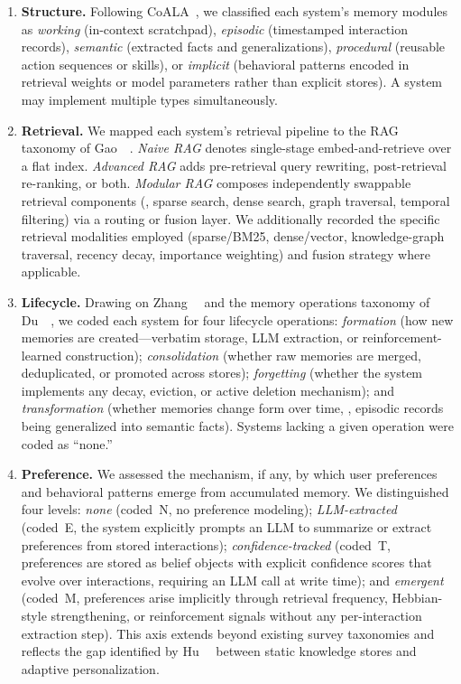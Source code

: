 \begin{enumerate}[leftmargin=*, nosep]
    \item \textbf{Structure.} Following CoALA~\cite{sumers2024coala}, we
    classified each system's memory modules as \emph{working} (in-context
    scratchpad), \emph{episodic} (timestamped interaction records),
    \emph{semantic} (extracted facts and generalizations),
    \emph{procedural} (reusable action sequences or skills), or
    \emph{implicit} (behavioral patterns encoded in retrieval weights or
    model parameters rather than explicit stores). A system may implement
    multiple types simultaneously.

    \item \textbf{Retrieval.} We mapped each system's retrieval pipeline
    to the RAG taxonomy of Gao~\etal~\cite{gao2023rag}. \emph{Naive RAG}
    denotes single-stage embed-and-retrieve over a flat index.
    \emph{Advanced RAG} adds pre-retrieval query rewriting, post-retrieval
    re-ranking, or both. \emph{Modular RAG} composes independently
    swappable retrieval components (\eg, sparse search, dense search,
    graph traversal, temporal filtering) via a routing or fusion layer.
    We additionally recorded the specific retrieval modalities employed
    (sparse/BM25, dense/vector, knowledge-graph traversal, recency decay,
    importance weighting) and fusion strategy where applicable.

    \item \textbf{Lifecycle.} Drawing on Zhang~\etal~\cite{zhang2024survey}
    and the memory operations taxonomy of Du~\etal~\cite{du2025memory}, we
    coded each system for four lifecycle operations: \emph{formation} (how
    new memories are created---verbatim storage, LLM extraction, or
    reinforcement-learned construction); \emph{consolidation} (whether raw
    memories are merged, deduplicated, or promoted across stores);
    \emph{forgetting} (whether the system implements any decay, eviction,
    or active deletion mechanism); and \emph{transformation} (whether
    memories change form over time, \eg, episodic records being
    generalized into semantic facts). Systems lacking a given operation
    were coded as ``none.''

    \item \textbf{Preference.} We assessed the mechanism, if any, by
    which user preferences and behavioral patterns emerge from accumulated
    memory. We distinguished four levels: \emph{none} (coded~N, no
    preference modeling); \emph{LLM-extracted} (coded~E, the system
    explicitly prompts an LLM to summarize or extract preferences from
    stored interactions); \emph{confidence-tracked} (coded~T, preferences
    are stored as belief objects with explicit confidence scores that
    evolve over interactions, requiring an LLM call at write time); and
    \emph{emergent} (coded~M, preferences arise implicitly through
    retrieval frequency, Hebbian-style strengthening, or reinforcement
    signals without any per-interaction extraction step). This axis
    extends beyond existing survey taxonomies and reflects the gap
    identified by Hu~\etal~\cite{hu2025memory} between static knowledge
    stores and adaptive personalization.
\end{enumerate}

